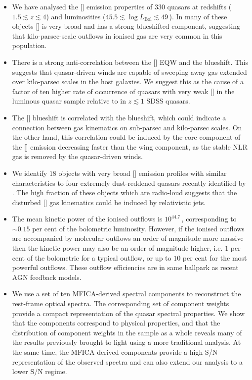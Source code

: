 \begin{itemize}

\item We have analysed the [] emission properties of $330$ quasars at redshifts ($1.5 \lesssim z \lesssim 4$) and luminosities ($45.5 \lesssim \log L_{\text{Bol}} \lesssim 49$\,\ergs). In many of these objects [] is very broad and has a strong blueshifted component, suggesting that kilo-parsec-scale outflows in ionised gas are very common in this population. 

\item There is a strong anti-correlation between the [] EQW and the  blueshift. This suggests that quasar-driven winds are capable of sweeping away gas extended over kilo-parsec scales in the host galaxies. We suggest this as the cause of a factor of ten higher rate of occurrence of quasars with very weak [] in the luminous quasar sample relative to in $z \lesssim 1$ SDSS quasars. 

\item The [] blueshift is correlated with the  blueshift, which could indicate a connection between gas kinematics on sub-parsec and kilo-parsec scales. On the other hand, this correlation could be induced by the core component of the [] emission decreasing faster than the wing component, as the stable NLR gas is removed by the quasar-driven winds.  

\item We identify $18$ objects with very broad [] emission profiles with similar characteristics to four extremely dust-reddened quasars recently identified by \citet{zakamska16}. The high fraction of these objects which are radio-loud suggests that the disturbed [] gas kinematics could be induced by relativistic jets. 

\item The mean kinetic power of the ionised outflows is $10^{44.7}$\,\ergs, corresponding to $\sim0.15$ per cent of the bolometric luminosity. However, if the ionised outflows are accompanied by molecular outflows an order of magnitude more massive then the kinetic power may also be an order of magnitude higher, i.e. $1$ per cent of the bolometric for a typical outflow, or up to $10$ per cent for the most powerful outflows. These outflow efficiencies are in same ballpark as recent AGN feedback models.

\item We use a set of ten MFICA-derived spectral components to reconstruct the rest-frame optical spectra. The corresponding set of component weights provide a compact representation of the quasar spectral properties. We show that the components correspond to physical properties, and that the distribution of component weights in the sample as a whole reveals many of the results previously brought to light using a more traditional analysis. At the same time, the MFICA-derived components provide a high S/N representation of the observed spectra and can also extend our analysis to a lower S/N regime. 

\end{itemize}
 


